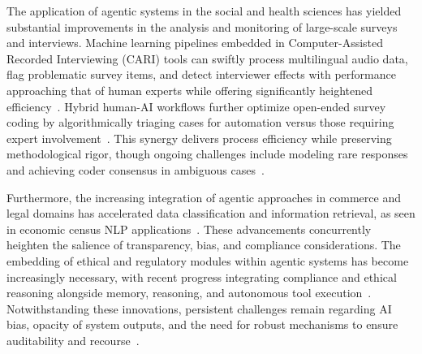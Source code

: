 \documentclass[sigconf]{acmart}
\begin{document}
The application of agentic systems in the social and health sciences has yielded substantial improvements in the analysis and monitoring of large-scale surveys and interviews. Machine learning pipelines embedded in Computer-Assisted Recorded Interviewing (CARI) tools can swiftly process multilingual audio data, flag problematic survey items, and detect interviewer effects with performance approaching that of human experts while offering significantly heightened efficiency~\cite{ref27,ref28,ref29,ref97,ref98,ref99,ref100,ref112}. Hybrid human-AI workflows further optimize open-ended survey coding by algorithmically triaging cases for automation versus those requiring expert involvement~\cite{ref27,ref28}. This synergy delivers process efficiency while preserving methodological rigor, though ongoing challenges include modeling rare responses and achieving coder consensus in ambiguous cases~\cite{ref27,ref29,ref97}.

Furthermore, the increasing integration of agentic approaches in commerce and legal domains has accelerated data classification and information retrieval, as seen in economic census NLP applications~\cite{ref26}. These advancements concurrently heighten the salience of transparency, bias, and compliance considerations. The embedding of ethical and regulatory modules within agentic systems has become increasingly necessary, with recent progress integrating compliance and ethical reasoning alongside memory, reasoning, and autonomous tool execution~\cite{ref40,ref109,ref111}. Notwithstanding these innovations, persistent challenges remain regarding AI bias, opacity of system outputs, and the need for robust mechanisms to ensure auditability and recourse~\cite{ref109,ref110,ref112,ref113,ref114,ref115}.
\end{document}
